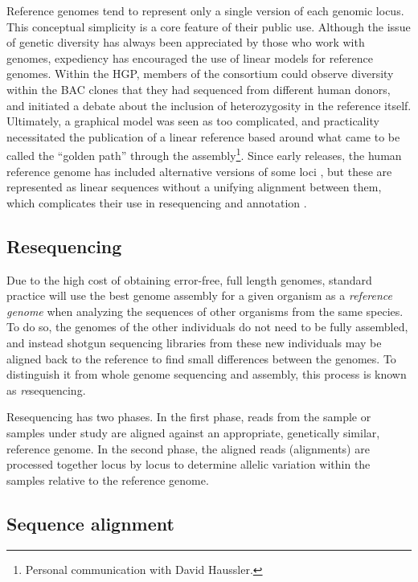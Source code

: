 Reference genomes tend to represent only a single version of each genomic locus.
This conceptual simplicity is a core feature of their public use.
Although the issue of genetic diversity has always been appreciated by those who work with genomes, expediency has encouraged the use of linear models for reference genomes.
Within the HGP, members of the consortium could observe diversity within the BAC clones that they had sequenced from different human donors, and initiated a debate about the inclusion of heterozygosity in the reference itself.
Ultimately, a graphical model was seen as too complicated, and practicality necessitated the publication of a linear reference based around what came to be called the ``golden path'' through the assembly\footnote{Personal communication with David Haussler.}.
Since early releases, the human reference genome has included alternative versions of some loci \cite{schneider2017evaluation,church2018genomes}, but these are represented as linear sequences without a unifying alignment between them, which complicates their use in resequencing and annotation \cite{jager2016alternate}.

\subsection{Resequencing}

Due to the high cost of obtaining error-free, full length genomes, standard practice will use the best genome assembly for a given organism as a \emph{reference genome} when analyzing the sequences of other organisms from the same species.
To do so, the genomes of the other individuals do not need to be fully assembled, and instead shotgun sequencing libraries from these new individuals may be aligned back to the reference to find small differences between the genomes.
To distinguish it from whole genome sequencing and assembly, this process is known as \emph{re}sequencing.

Resequencing has two phases.
In the first phase, reads from the sample or samples under study are aligned against an appropriate, genetically similar, reference genome.
In the second phase, the aligned reads (alignments) are processed together locus by locus to determine allelic variation within the samples relative to the reference genome.

\subsection{Sequence alignment}
\label{sec:sequence_alignment}

